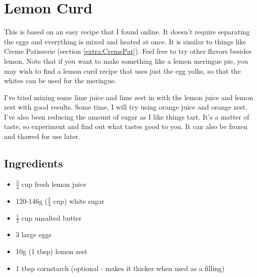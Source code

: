 \documentclass[10pt, openany]{book}
\begin{document}
\section{Lemon Curd}
\label{extra:LemonCurd}
This is based on an easy recipe that I found online.  It doesn't require separating the eggs and everything is mixed and heated at once.  It is similar to things like Creme Patisserie (section \ref{extra:CremePat}).  Feel free to try other flavors besides lemon.  Note that if you want to make something like a lemon meringue pie, you may wish to find a lemon curd recipe that uses just the egg yolks, so that the whites can be used for the meringue.

I've tried mixing some lime juice and lime zest in with the lemon juice and lemon zest with good results.  Some time, I will try using orange juice and orange zest. I've also been reducing the amount of sugar as I like things tart.  It's a matter of taste, so experiment and find out what tastes good to you.  It can also be frozen and thawed for use later.

\subsection{Ingredients}
\begin{itemize}
  \item $\frac{3}{4}$ cup fresh lemon juice
  \item 120-146g ($\frac{3}{4}$ cup) white sugar
  \item $\frac{1}{2}$ cup unsalted butter
  \item 3 large eggs
  \item 10g (1 tbsp) lemon zest
  \item 1 tbsp cornstarch (optional - makes it thicker when used as a filling)
\end{itemize}
\end{document}
